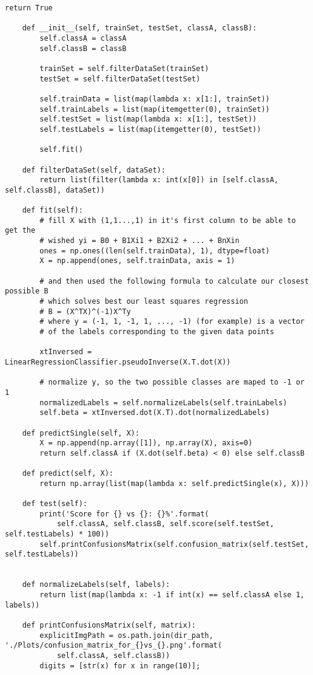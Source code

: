 \begin{lstlisting}[style=py]
		return True

	def __init__(self, trainSet, testSet, classA, classB):
		self.classA = classA
		self.classB = classB

		trainSet = self.filterDataSet(trainSet)
		testSet = self.filterDataSet(testSet)

		self.trainData = list(map(lambda x: x[1:], trainSet))
		self.trainLabels = list(map(itemgetter(0), trainSet))
		self.testSet = list(map(lambda x: x[1:], testSet))
		self.testLabels = list(map(itemgetter(0), testSet))

		self.fit()

	def filterDataSet(self, dataSet):
		return list(filter(lambda x: int(x[0]) in [self.classA, self.classB], dataSet))

	def fit(self):
		# fill X with (1,1...,1) in it's first column to be able to get the
		# wished yi = B0 + B1Xi1 + B2Xi2 + ... + BnXin
		ones = np.ones((len(self.trainData), 1), dtype=float)
		X = np.append(ones, self.trainData, axis = 1)

		# and then used the following formula to calculate our closest possible B
		# which solves best our least squares regression
		# B = (X^TX)^(-1)X^Ty
		# where y = (-1, 1, -1, 1, ..., -1) (for example) is a vector
		# of the labels corresponding to the given data points

		xtInversed = LinearRegressionClassifier.pseudoInverse(X.T.dot(X))

		# normalize y, so the two possible classes are maped to -1 or 1
		normalizedLabels = self.normalizeLabels(self.trainLabels)
		self.beta = xtInversed.dot(X.T).dot(normalizedLabels)

	def predictSingle(self, X):
		X = np.append(np.array([1]), np.array(X), axis=0)
		return self.classA if (X.dot(self.beta) < 0) else self.classB

	def predict(self, X):
		return np.array(list(map(lambda x: self.predictSingle(x), X)))

	def test(self):
		print('Score for {} vs {}: {}%'.format(
			self.classA, self.classB, self.score(self.testSet, self.testLabels) * 100))
		self.printConfusionsMatrix(self.confusion_matrix(self.testSet, self.testLabels))


	def normalizeLabels(self, labels):
		return list(map(lambda x: -1 if int(x) == self.classA else 1, labels))

	def printConfusionsMatrix(self, matrix):
		explicitImgPath = os.path.join(dir_path, './Plots/confusion_matrix_for_{}vs_{}.png'.format(
			self.classA, self.classB))
		digits = [str(x) for x in range(10)];


\end{lstlisting}
